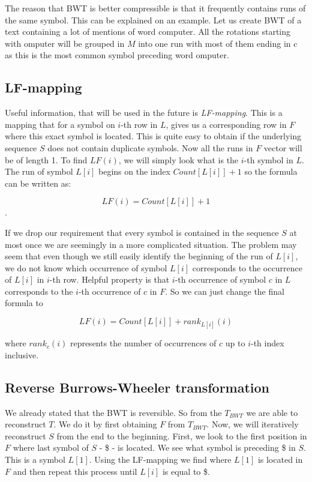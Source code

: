 The reason that BWT is better compressible is that it frequently contains runs of
the same symbol. This can be explained on an example. Let us create BWT of a text containing
a lot of mentions of word computer. All the rotations starting with omputer will be grouped
in $M$ into one run with most of them ending in c as this is the most common symbol
preceding word omputer.

\subsection{LF-mapping}

Useful information, that will be used in the future is \textit{LF-mapping}.
This is a mapping that for a symbol on $i$-th row in $L$, gives us a corresponding row in $F$
where this exact symbol is located. This is quite easy to obtain if the underlying sequence $S$
does not contain duplicate symbols. Now all the runs in $F$ vector will be of length 1.
To find $LF(i)$, we will simply look what is the $i$-th symbol in $L$. The run of
symbol $L[i]$ begins on the index $Count[L[i]] + 1$ so the formula can be written as:

$$LF(i) = Count[L[i]] + 1$$.

If we drop our requirement that every symbol is contained in the sequence $S$ at most once
we are seemingly in a more complicated situation. The problem may seem that even
though we still easily identify the beginning of the run of $L[i]$, we do not
know which occurrence of symbol $L[i]$ corresponds to the occurrence of $L[i]$ in $i$-th row.
Helpful property is that $i$-th occurrence of symbol $c$ in $L$ corresponds to the
$i$-th occurrence of $c$ in $F$. So we can just change the final formula to

				$$LF(i) = Count[L[i]] + rank_{L[i]}(i)$$

where $rank_c(i)$ represents the number of occurrences of $c$ up to $i$-th index inclusive.

\subsection{Reverse Burrows-Wheeler transformation}

We already stated that the BWT is reversible. So from the $T_{BWT}$ we are able to reconstruct
$T$. We do it by first obtaining $F$ from $T_{BWT}$. Now, we will iteratively reconstruct $S$
from the end to the beginning. First, we look to the first position in $F$ where last symbol
of $S$ - \$ - is located. We see what symbol is preceding \$ in $S$. This is a symbol
$L[1]$. Using the LF-mapping we find where $L[1]$ is located in $F$ and then repeat this process
until $L[i]$ is equal to \$.

